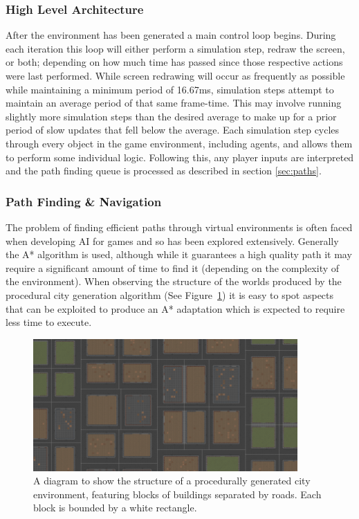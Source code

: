 \documentclass[a4paper,12pt]{article}
\begin{document}
\subsubsection{High Level Architecture}\noindent
After the environment has been generated a main control loop begins. During each iteration this loop will either perform a simulation step, redraw the screen, or both; depending on how much time has passed since those respective actions were last performed. While screen redrawing will occur as frequently as possible while maintaining a minimum period of 16.67ms, simulation steps attempt to maintain an average period of that same frame-time. This may involve running slightly more simulation steps than the desired average to make up for a prior period of slow updates that fell below the average. Each simulation step cycles through every object in the game environment, including agents, and allows them to perform some individual logic. Following this, any player inputs are interpreted and the path finding queue is processed as described in section \ref{sec:paths}.

\subsubsection{Path Finding \& Navigation}\noindent
The problem of finding efficient paths through virtual environments is often faced when developing AI for games and so has been explored extensively. Generally the A* algorithm \cite{hart68} is used, although while it guarantees a high quality path it may require a significant amount of time to find it (depending on the complexity of the environment). When observing the structure of the worlds produced by the procedural city generation algorithm (See Figure~\ref{fig:block}) it is easy to spot aspects that can be exploited to produce an A* adaptation which is expected to require less time to execute.

\label{sec:paths}
\begin{figure}[h]
\centering
\includegraphics[width=0.9\textwidth]{blocks}
\caption{A diagram to show the structure of a procedurally generated city environment, featuring blocks of buildings separated by roads. Each block is bounded by a white rectangle.}
\label{fig:block}
\end{figure}
\end{document}
